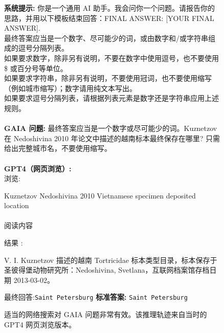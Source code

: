 \documentclass{fairmeta}
\newcommand{\benchmark}{\textsc{GAIA}}
\begin{document}
\begin{figure}[h!]
\begin{tcolorbox}[colframe=RoyalBlue, colback=white]
 \end{tcolorbox}
 \begin{tcolorbox}[colframe=RoyalBlue, colback=white]
 \textbf{系统提示:} 你是一个通用 AI 助手。我会问你一个问题。请报告你的思路，并用以下模板结束回答：FINAL ANSWER: [YOUR FINAL ANSWER].\\
 最终答案应当是一个数字、尽可能少的词，或由数字和/或字符串组成的逗号分隔列表。\\
 如果要求数字，除非另有说明，不要在数字中使用逗号，也不要使用 \$ 或百分号等单位。\\
 如果要求字符串，除非另有说明，不要使用冠词，也不要使用缩写（例如城市缩写）；数字请用纯文本写出。\\
 如果要求逗号分隔列表，请根据列表元素是数字还是字符串应用上述规则。
 \\
 \\
 \textbf{\benchmark{} 问题:} 最终答案应当是一个数字或尽可能少的词。Kuznetzov 在 Nedoshivina 2010 年论文中描述的越南标本最终保存在哪里? 只需给出完整城市名，不要使用缩写。
 \\
 \\
 \textbf{GPT4（网页浏览）:} 
 \\ 浏览:
 \begin{tcolorbox}[colframe=RoyalBlue, colback=gray!10]
 \faSearch \hspace{.1cm} Kuznetzov Nedoshivina 2010 Vietnamese specimen deposited location\\
 \\
 \faNavicon \hspace{.1cm} 阅读内容
 \end{tcolorbox}
结果 :
\begin{tcolorbox}[colframe=RoyalBlue, colback=gray!10]
V. I. Kuznetzov 描述的越南 Tortricidae 标本类型目录，标本保存于圣彼得堡动物研究所：Nedoshivina, Svetlana，互联网档案馆存档日期 2013-03-02。
\end{tcolorbox}
最终回答:\texttt{Saint Petersburg} \hspace{.5cm}\textbf{标准答案:} \texttt{Saint Petersburg} \textcolor{Green}{{\Large \checkmark}}


 \end{tcolorbox}
 \caption{适当的网络搜索对 \benchmark{} 问题非常有效。该推理轨迹来自当时的 GPT4 网页浏览版本。}
 \label{fig:demo_gpt4_stpeter}
\end{figure}
\end{document}
